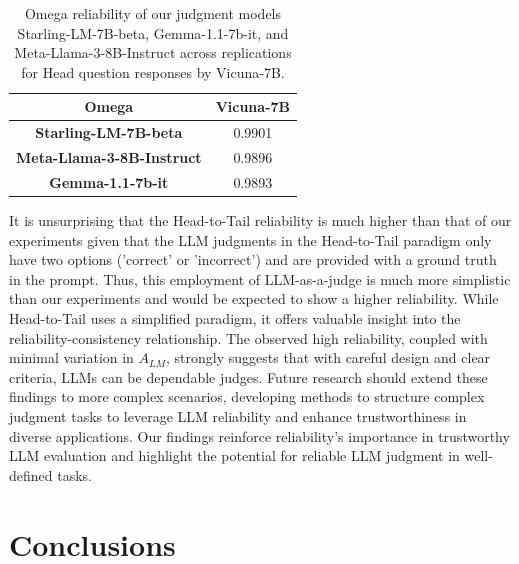\documentclass[11pt]{article}
\begin{document}
\begin{table}
    \centering
    \begin{tabular}{cc}%
         \textbf{Omega} & \textbf{Vicuna-7B} \\%
         \hline
         \textbf{Starling-LM-7B-beta} & 0.9901 \\%
         \textbf{Meta-Llama-3-8B-Instruct} & 0.9896 \\%
         \textbf{Gemma-1.1-7b-it} & 0.9893 \\%
         \hline
    \end{tabular}
    \caption{Omega reliability of our judgment models Starling-LM-7B-beta, Gemma-1.1-7b-it, and Meta-Llama-3-8B-Instruct across replications for Head question responses by Vicuna-7B.}
    \label{tab:app_reliab}
\end{table}


It is unsurprising that the Head-to-Tail reliability is much higher than that of our experiments given that the LLM judgments in the Head-to-Tail paradigm only have two options ('correct' or 'incorrect') and are provided with a ground truth in the prompt. Thus, this employment of LLM-as-a-judge is much more simplistic than our experiments and would be expected to show a higher reliability. While Head-to-Tail uses a simplified paradigm, it offers valuable insight into the reliability-consistency relationship. The observed high reliability, coupled with minimal variation in $A_{LM}$, strongly suggests that with careful design and clear criteria, LLMs can be dependable judges. Future research should extend these findings to more complex scenarios, developing methods to structure complex judgment tasks to leverage LLM reliability and enhance trustworthiness in diverse applications. Our findings reinforce reliability's importance in trustworthy LLM evaluation and highlight the potential for reliable LLM judgment in well-defined tasks.


\section{Conclusions}
\end{document}
